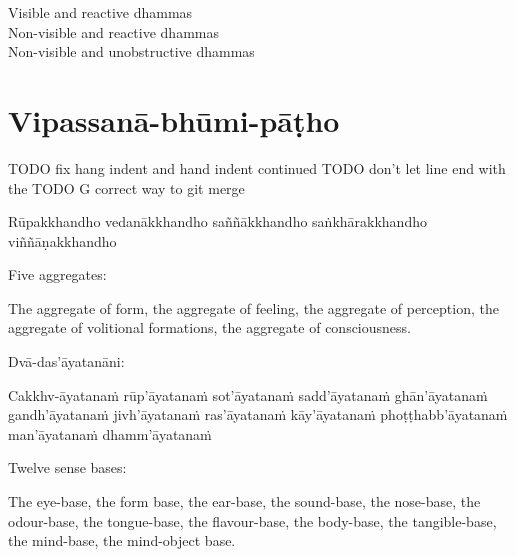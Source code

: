 \begin{english-verses}
  Visible and reactive dhammas\\
  Non-visible and reactive dhammas\\
  Non-visible and unobstructive dhammas
\end{english-verses}

\suttaRef{[Dhs 1]}

\section{Vipassanā-bhūmi-pāṭho}
\label{vipassana-bhumi-patho}

TODO fix hang indent and hand indent continued
TODO don't let line end with the
TODO G correct way to git merge

\begin{pali-hangtogether}
  Rūpakkhandho vedanākkhandho saññākkhandho saṅkhārakkhandho viññāṇakkhandho
\end{pali-hangtogether}

\begin{english-verses}
  Five aggregates:
  \begin{english-hangtogether-verses}
    The aggregate of form, the aggregate of feeling, the aggregate of perception, the aggregate of volitional formations, the aggregate of consciousness.
  \end{english-hangtogether-verses}
\end{english-verses}

\suttaRef{[MN 109]}

\begin{pali-hang-continued}
  Dvā-das'āyatanāni:
  \begin{pali-hangtogether}
    Cakkhv-āyatanaṁ rūp'āyatanaṁ sot'āyatanaṁ sadd'āyatanaṁ ghān'āyatanaṁ gandh'āyatanaṁ jivh'āyatanaṁ ras'āyatanaṁ kāy'āyatanaṁ phoṭṭhabb'āyatanaṁ man'āyatanaṁ dhamm'āyatanaṁ
  \end{pali-hangtogether}
\end{pali-hang-continued}

\begin{english-verses}
  Twelve sense bases:
  \begin{english-hangtogether-verses}
    The eye-base, the form base, the ear-base, the sound-base, the nose-base, the odour-base, the tongue-base, the flavour-base, the body-base, the tangible-base, the mind-base, the mind-object base.
  \end{english-hangtogether-verses}
\end{english-verses}

